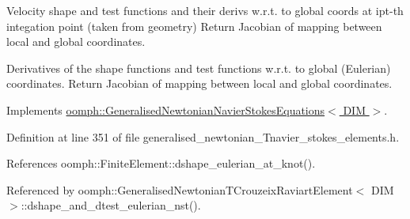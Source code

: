 Velocity shape and test functions and their derivs w.\+r.\+t. to global coords at ipt-\/th integation point (taken from geometry) Return Jacobian of mapping between local and global coordinates. 

Derivatives of the shape functions and test functions w.\+r.\+t. to global (Eulerian) coordinates. Return Jacobian of mapping between local and global coordinates. 

Implements \hyperlink{classoomph_1_1GeneralisedNewtonianNavierStokesEquations_a20efdbf511d69c1176c6b3df4dfc5fb3}{oomph\+::\+Generalised\+Newtonian\+Navier\+Stokes\+Equations$<$ D\+I\+M $>$}.



Definition at line 351 of file generalised\+\_\+newtonian\+\_\+\+Tnavier\+\_\+stokes\+\_\+elements.\+h.



References oomph\+::\+Finite\+Element\+::dshape\+\_\+eulerian\+\_\+at\+\_\+knot().



Referenced by oomph\+::\+Generalised\+Newtonian\+T\+Crouzeix\+Raviart\+Element$<$ D\+I\+M $>$\+::dshape\+\_\+and\+\_\+dtest\+\_\+eulerian\+\_\+nst().

\mbox{\label{classoomph_1_1GeneralisedNewtonianTCrouzeixRaviartElement_a303c486ab421e1533adcc3f1ccb2da88}} 

